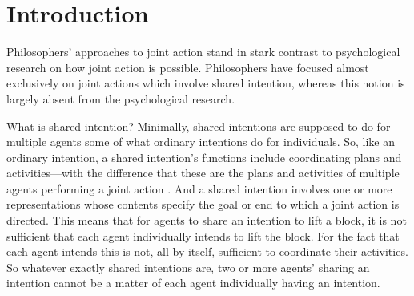 \documentclass[12pt,a4paper]{extarticle}
\begin{document}
\setlength\footnotesep{1em}


\maketitle

\begin{abstract}
[*redo]
A joint action is a goal-directed action, or something resembling one, comprising two or more agents' goal-directed activities.  
What is the relation between a joint action and the goal (or goals) to which it is directed?  
Standard answers to this question take for granted that  this relation invariably involves shared intention.  
Yet research in both psychology and philosophy reveals the existence of goal-directed joint actions without shared intentions.
Making sense of this research requires an account of the relation between joint actions and their goals invoking nothing like shared intention.
This paper provides such an account by introducing the notion of a collective goal.
Collective goals are a necessary but neglected building block for research, both theoretical and empirical, on joint action.



\end{abstract}


\section{Introduction}


  
Philosophers' approaches to joint action stand in stark contrast to psychological research on how joint action is possible.
Philosophers have focused almost exclusively on joint actions which involve shared intention, whereas this notion is largely absent from the psychological research.  

What is shared intention?  
Minimally, shared intentions are supposed to do for multiple agents some of what ordinary intentions do for individuals.  
So, like an ordinary intention, a shared intention's functions include coordinating plans and activities---with the difference that these are the plans and activities of multiple agents performing a joint action \citep{Bratman:1993je}.
And a shared intention involves one or more representations whose contents specify the goal or end to which a joint action is directed.
This means that for agents to share an intention to lift a block, it is not sufficient that each agent individually intends to lift the block.  
For the fact that each agent intends this is not, all by itself, sufficient to coordinate their activities.
So whatever exactly shared intentions are, two or more agents' sharing an intention cannot be a matter of each agent individually having an intention.
\end{document}
